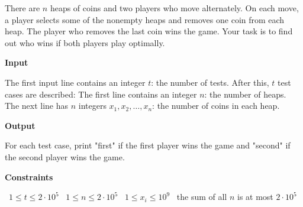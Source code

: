 There are $n$ heaps of coins and two players who move alternately. On each move, a player selects some of the nonempty heaps and removes one coin from each heap. The player who removes the last coin wins the game.
Your task is to find out who wins if both players play optimally.

\vspace{0.3cm}\noindent\textbf{Input}

The first input line contains an integer $t$: the number of tests. After this, $t$ test cases are described:
The first line contains an integer $n$: the number of heaps.
The next line has $n$ integers $x_1,x_2,\ldots,x_n$: the number of coins in each heap.

\vspace{0.3cm}\noindent\textbf{Output}

For each test case, print "first" if the first player wins the game and "second" if the second player wins the game.

\vspace{0.3cm}\noindent\textbf{Constraints}

\textbullet\ $1 \le t \le 2 \cdot 10^5$
\textbullet\ $1 \le n \le 2 \cdot 10^5$
\textbullet\ $1 \le x_i \le 10^9$
\textbullet\ the sum of all $n$ is at most $2 \cdot 10^5$